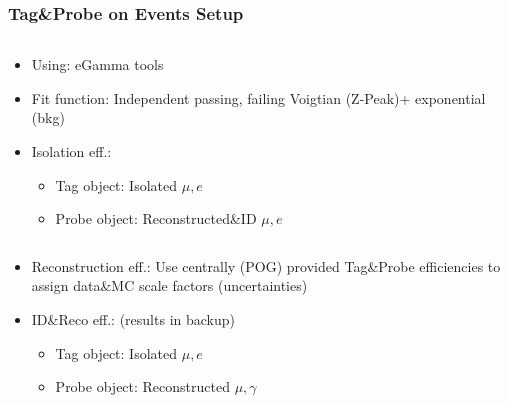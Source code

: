 \documentclass{beamer}
\begin{document}
\begin{frame}
 \frametitle{Tag\&Probe on \Zll Events Setup}
  \begin{columns}
 \begin{column}{0.50\textwidth}
  \begin{itemize}
   \item Using: eGamma tools
   \item Fit function: Independent passing, failing Voigtian (Z-Peak)+ exponential (bkg)
   \item Isolation eff.:
   \begin{itemize}
    \item Tag object: Isolated $\mu,e$
    \item Probe object: Reconstructed\&ID $\mu,e$
   \end{itemize}
 \end{itemize}
 \end{column}
  \begin{column}{0.50\textwidth}
  \end{column}
 \end{columns}
 \begin{itemize}
  \item Reconstruction eff.: Use centrally (POG) provided Tag\&Probe efficiencies to assign data\&MC scale factors (uncertainties)
  \item ID\&Reco eff.: (results in backup)
  \begin{itemize}
   \item Tag object: Isolated $\mu,e$
   \item Probe object: Reconstructed $\mu,\gamma$
  \end{itemize}

 \end{itemize}

\end{frame}
\end{document}
